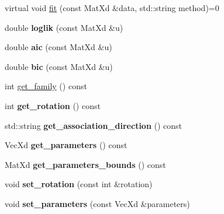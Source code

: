 {\bf }\par
\begin{DoxyCompactItemize}
\item 
virtual void \hyperlink{class_bicop_a0ff40d8054e11ed8aaa4956c7fd84e89}{fit} (const Mat\+Xd \&data, std\+::string method)=0
\item 
double {\bfseries loglik} (const Mat\+Xd \&u)\hypertarget{class_bicop_a994d28aa99b881425f012605aef3ae68}{}\label{class_bicop_a994d28aa99b881425f012605aef3ae68}

\item 
double {\bfseries aic} (const Mat\+Xd \&u)\hypertarget{class_bicop_adb4aecd877fc32cc857e2477d5bddf9b}{}\label{class_bicop_adb4aecd877fc32cc857e2477d5bddf9b}

\item 
double {\bfseries bic} (const Mat\+Xd \&u)\hypertarget{class_bicop_a68ee43f29c026aaf8157673c1ddf29b2}{}\label{class_bicop_a68ee43f29c026aaf8157673c1ddf29b2}

\end{DoxyCompactItemize}

{\bf }\par
\begin{DoxyCompactItemize}
\item 
int \hyperlink{class_bicop_a78a564f6e071e8dba7bcd93fdd1b05a4}{get\+\_\+family} () const 
\item 
int {\bfseries get\+\_\+rotation} () const \hypertarget{class_bicop_a0cf41f139c731d37841a411be5123155}{}\label{class_bicop_a0cf41f139c731d37841a411be5123155}

\item 
std\+::string {\bfseries get\+\_\+association\+\_\+direction} () const \hypertarget{class_bicop_a6758285bf2e354bbfbf8f8e0465567ba}{}\label{class_bicop_a6758285bf2e354bbfbf8f8e0465567ba}

\item 
Vec\+Xd {\bfseries get\+\_\+parameters} () const \hypertarget{class_bicop_a5ae1eb1665235ea822f0f62b69085047}{}\label{class_bicop_a5ae1eb1665235ea822f0f62b69085047}

\item 
Mat\+Xd {\bfseries get\+\_\+parameters\+\_\+bounds} () const \hypertarget{class_bicop_af3387cb6498e8b08c23d442a437ef6e0}{}\label{class_bicop_af3387cb6498e8b08c23d442a437ef6e0}

\item 
void {\bfseries set\+\_\+rotation} (const int \&rotation)\hypertarget{class_bicop_af5cded47298fa11fc0f997d7a873cf92}{}\label{class_bicop_af5cded47298fa11fc0f997d7a873cf92}

\item 
void {\bfseries set\+\_\+parameters} (const Vec\+Xd \&parameters)\hypertarget{class_bicop_a86d6d832e19d4e947fad68590e6f1b40}{}\label{class_bicop_a86d6d832e19d4e947fad68590e6f1b40}

\end{DoxyCompactItemize}

